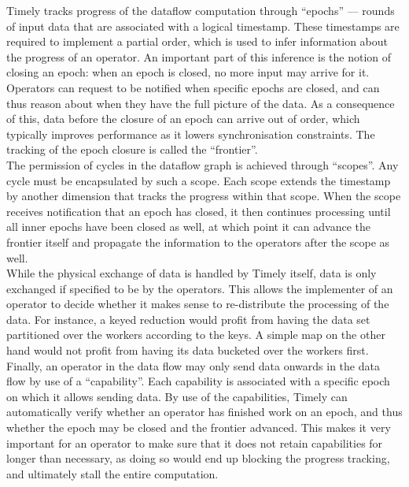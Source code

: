 Timely tracks progress of the dataflow computation through ``epochs'' --- rounds of input data that are associated with a logical timestamp. These timestamps are required to implement a partial order, which is used to infer information about the progress of an operator. An important part of this inference is the notion of closing an epoch: when an epoch is closed, no more input may arrive for it. Operators can request to be notified when specific epochs are closed, and can thus reason about when they have the full picture of the data. As a consequence of this, data before the closure of an epoch can arrive out of order, which typically improves performance as it lowers synchronisation constraints. The tracking of the epoch closure is called the ``frontier''. \\

The permission of cycles in the dataflow graph is achieved through ``scopes''. Any cycle must be encapsulated by such a scope. Each scope extends the timestamp by another dimension that tracks the progress within that scope. When the scope receives notification that an epoch has closed, it then continues processing until all inner epochs have been closed as well, at which point it can advance the frontier itself and propagate the information to the operators after the scope as well. \\

While the physical exchange of data is handled by Timely itself, data is only exchanged if specified to be by the operators. This allows the implementer of an operator to decide whether it makes sense to re-distribute the processing of the data. For instance, a keyed reduction would profit from having the data set partitioned over the workers according to the keys. A simple map on the other hand would not profit from having its data bucketed over the workers first. \\

Finally, an operator in the data flow may only send data onwards in the data flow by use of a ``capability''. Each capability is associated with a specific epoch on which it allows sending data. By use of the capabilities, Timely can automatically verify whether an operator has finished work on an epoch, and thus whether the epoch may be closed and the frontier advanced. This makes it very important for an operator to make sure that it does not retain capabilities for longer than necessary, as doing so would end up blocking the progress tracking, and ultimately stall the entire computation.

